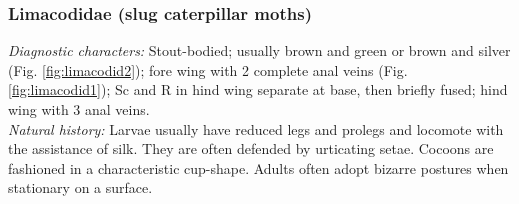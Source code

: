 \documentclass[letterpaper, 11pt]{article}
\begin{document}
\subsubsection{Limacodidae (slug caterpillar moths)}
\noindent{}\textit{Diagnostic characters:} Stout-bodied; usually brown and green or brown and silver (Fig. \ref{fig:limacodid2}); fore wing with 2 complete anal veins (Fig. \ref{fig:limacodid1}); Sc and R in hind wing separate at base, then briefly fused; hind wing with 3 anal veins.\\

\noindent{}\textit{Natural history:} Larvae usually have reduced legs and prolegs and locomote with the assistance of silk. They are often defended by urticating setae. Cocoons are fashioned in a characteristic cup-shape. Adults often adopt bizarre postures when stationary on a surface.
\end{document}
